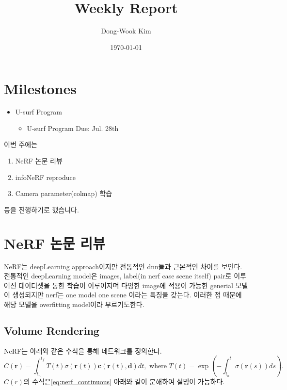 \documentclass{vipweekly}
\title{Weekly Report} %
\author{Dong-Wook Kim} %
\date{\today} %
\begin{document}
\maketitle
\hypersetup{citecolor=blue}

\section*{Milestones}
\begin{itemize} 
    \item U-surf Program \\
    \begin{itemize}
        \item U-surf Program Due: Jul. 28th\\
    \end{itemize}
\end{itemize}
이번 주에는 
\begin{enumerate}
    \item NeRF\cite{nerf} 논문 리뷰
    \item infoNeRF\cite{infonerf} reproduce
    \item Camera parameter(colmap) 학습
    
\end{enumerate} 
등을 진행하기로 했습니다.


\section{NeRF\cite{nerf} 논문 리뷰}

NeRF\cite{nerf}는 deepLearning approach이지만 전통적인 dnn들과 근본적인 차이를 보인다. 
전통적인 deepLearning model은 images, label(in nerf case scene itself) pair로 
이루어진 데이터셋을 통한 학습이 이루어지며 다양한 image에 적용이 가능한 generial 모델이 
생성되지만 nerf는 one model one scene 이라는 특징을 갖는다. 
이러한 점 때문에 해당 모델을 overfitting model이라 부르기도한다. 

\subsection{Volume Rendering}

NeRF\cite{nerf}는 아래와 같은 수식을 통해 네트워크를 정의한다. 
\begin{equation}
    C(\mathbf{r})=\int_{t_{n}}^{t_{f}} T(t) \sigma(\mathbf{r}(t)) \mathbf{c}(\mathbf{r}(t), \mathbf{d}) d t, \text { where } T(t)=\exp \left(-\int_{t_{n}}^{t} \sigma(\mathbf{r}(s)) d s\right) .
    \label{eq:nerf_continuous}
\end{equation}
$C(r)$의 수식은\eqref{eq:nerf_continuous} 아래와 같이 분해하여 설명이 가능하다.
\end{document}
